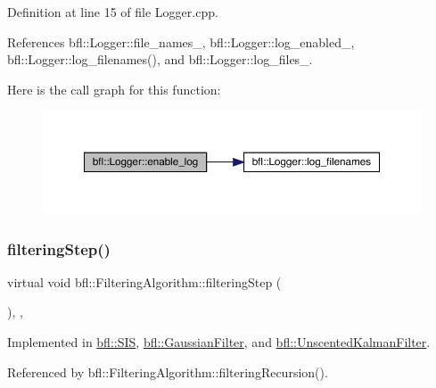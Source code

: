 Definition at line 15 of file Logger.\+cpp.



References bfl\+::\+Logger\+::file\+\_\+names\+\_\+, bfl\+::\+Logger\+::log\+\_\+enabled\+\_\+, bfl\+::\+Logger\+::log\+\_\+filenames(), and bfl\+::\+Logger\+::log\+\_\+files\+\_\+.

Here is the call graph for this function\+:
\nopagebreak
\begin{figure}[H]
\begin{center}
\leavevmode
\includegraphics[width=350pt]{classbfl_1_1Logger_ae94b97b6e8d7902e8ce048384813122e_cgraph}
\end{center}
\end{figure}
\mbox{\label{classbfl_1_1FilteringAlgorithm_ab3bceb43b5810a4bf1da884b8a0b145a}} 
\subsubsection{\texorpdfstring{filtering\+Step()}{filteringStep()}}
{\footnotesize\ttfamily virtual void bfl\+::\+Filtering\+Algorithm\+::filtering\+Step (\begin{DoxyParamCaption}{ }\end{DoxyParamCaption})\hspace{0.3cm}{\ttfamily [protected]}, {}, {\ttfamily [inherited]}}



Implemented in \mbox{\hyperlink{classbfl_1_1SIS_a582f06cc5456d2cc6ed8f90087cbbb4c}{bfl\+::\+S\+IS}}, \mbox{\hyperlink{classbfl_1_1GaussianFilter_ae30a175454a93685eca79d3ef857f7bc}{bfl\+::\+Gaussian\+Filter}}, and \mbox{\hyperlink{classbfl_1_1UnscentedKalmanFilter_a169451bb711a03ad2dc28a40e3ad867f}{bfl\+::\+Unscented\+Kalman\+Filter}}.



Referenced by bfl\+::\+Filtering\+Algorithm\+::filtering\+Recursion().

